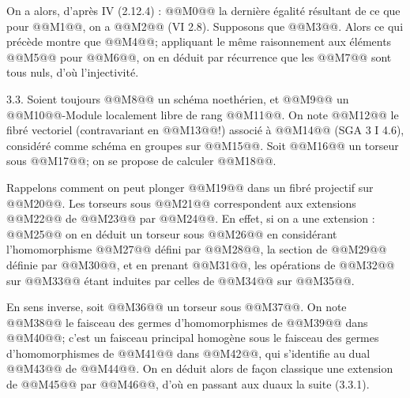 
On a alors, d'après IV (2.12.4) :
@@M0@@
la dernière égalité résultant de ce que pour @@M1@@, on a @@M2@@ (VI 2.8). Supposons que @@M3@@. Alors ce qui précède montre que @@M4@@; appliquant le même raisonnement aux éléments @@M5@@ pour @@M6@@, on en déduit par récurrence que les @@M7@@ sont tous nuls, d'où l'injectivité.

3.3. Soient toujours @@M8@@ un schéma noethérien, et @@M9@@ un @@M10@@-Module localement libre de rang @@M11@@. On note @@M12@@ le fibré vectoriel (contravariant en @@M13@@!) associé à @@M14@@ (SGA 3 I 4.6), considéré comme schéma en groupes sur @@M15@@. Soit @@M16@@ un torseur sous @@M17@@; on se propose de calculer @@M18@@.

Rappelons comment on peut plonger @@M19@@ dans un fibré projectif sur @@M20@@. Les torseurs sous @@M21@@ correspondent aux extensions @@M22@@ de @@M23@@ par @@M24@@. En effet, si on a une extension :
@@M25@@
on en déduit un torseur sous @@M26@@ en considérant l'homomorphisme @@M27@@ défini par @@M28@@, la section de @@M29@@ définie par @@M30@@, et en prenant @@M31@@, les opérations de @@M32@@ sur @@M33@@ étant induites par celles de @@M34@@ sur @@M35@@.

En sens inverse, soit @@M36@@ un torseur sous @@M37@@. On note @@M38@@ le faisceau des germes d'homomorphismes de @@M39@@ dans @@M40@@; c'est un faisceau principal homogène sous le faisceau des germes d'homomorphismes de @@M41@@ dans @@M42@@, qui s'identifie au dual @@M43@@ de @@M44@@. On en déduit alors de façon classique une extension de @@M45@@ par @@M46@@, d'où en passant aux duaux la suite (3.3.1).

